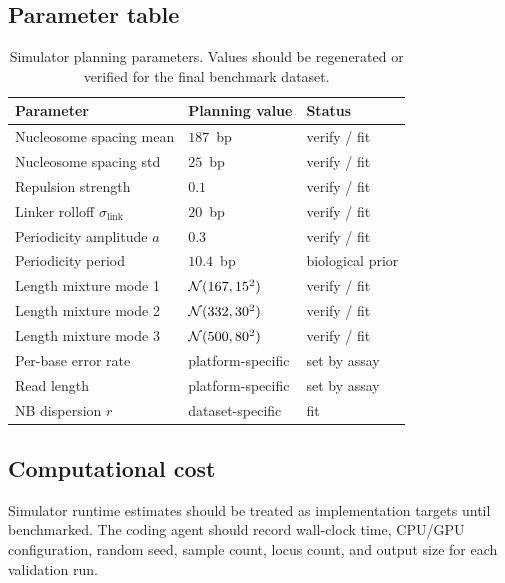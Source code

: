 \subsection*{Parameter table}
\begin{table}[htbp]
\centering\small
\caption{Simulator planning parameters. Values should be regenerated or verified for the final benchmark dataset.}
\label{tab:simparams}
\begin{tabular}{lll}
\toprule
Parameter & Planning value & Status \\
\midrule
Nucleosome spacing mean & $187$~bp & verify / fit \\
Nucleosome spacing std & $25$~bp & verify / fit \\
Repulsion strength & $0.1$ & verify / fit \\
Linker rolloff $\sigma_{\mathrm{link}}$ & $20$~bp & verify / fit \\
Periodicity amplitude $a$ & $0.3$ & verify / fit \\
Periodicity period & $10.4$~bp & biological prior \\
Length mixture mode 1 & $\mathcal{N}(167, 15^2)$ & verify / fit \\
Length mixture mode 2 & $\mathcal{N}(332, 30^2)$ & verify / fit \\
Length mixture mode 3 & $\mathcal{N}(500, 80^2)$ & verify / fit \\
Per-base error rate & platform-specific & set by assay \\
Read length & platform-specific & set by assay \\
NB dispersion $r$ & dataset-specific & fit \\
\bottomrule
\end{tabular}
\end{table}

\subsection*{Computational cost}
Simulator runtime estimates should be treated as implementation targets until benchmarked. The coding agent should record wall-clock time, CPU/GPU configuration, random seed, sample count, locus count, and output size for each validation run.
